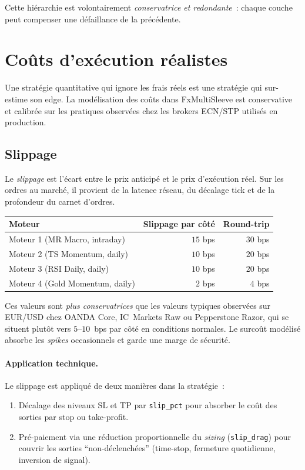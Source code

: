 \documentclass[11pt, a4paper]{scrartcl}
\begin{document}
Cette hiérarchie est volontairement \emph{conservatrice et redondante}~: chaque couche peut compenser une défaillance de la précédente.


\section{Coûts d'exécution réalistes}
\label{sec:costs}

Une stratégie quantitative qui ignore les frais réels est une stratégie qui sur-estime son edge. La modélisation des coûts dans FxMultiSleeve est conservative et calibrée sur les pratiques observées chez les brokers ECN/STP utilisés en production.

\subsection{Slippage}

Le \emph{slippage} est l'écart entre le prix anticipé et le prix d'exécution réel. Sur les ordres au marché, il provient de la latence réseau, du décalage tick et de la profondeur du carnet d'ordres.

\begin{center}
\renewcommand{\arraystretch}{1.2}
\begin{tabular}{lrr}
\toprule
\textbf{Moteur} & \textbf{Slippage par côté} & \textbf{Round-trip} \\
\midrule
Moteur 1 (MR Macro, intraday) & $15$ bps & $30$ bps \\
Moteur 2 (TS Momentum, daily) & $10$ bps & $20$ bps \\
Moteur 3 (RSI Daily, daily)   & $10$ bps & $20$ bps \\
Moteur 4 (Gold Momentum, daily) & $2$ bps & $4$ bps \\
\bottomrule
\end{tabular}
\end{center}

Ces valeurs sont \emph{plus conservatrices} que les valeurs typiques observées sur EUR/USD chez OANDA Core, IC~Markets Raw ou Pepperstone Razor, qui se situent plutôt vers $5$--$10$~bps par côté en conditions normales. Le surcoût modélisé absorbe les \emph{spikes} occasionnels et garde une marge de sécurité.

\paragraph{Application technique.}
Le slippage est appliqué de deux manières dans la stratégie~:
\begin{enumerate}
\item Décalage des niveaux SL et TP par \texttt{slip\_pct} pour absorber le coût des sorties par stop ou take-profit.
\item Pré-paiement via une réduction proportionnelle du \emph{sizing} (\texttt{slip\_drag}) pour couvrir les sorties \enquote{non-déclenchées} (time-stop, fermeture quotidienne, inversion de signal).
\end{enumerate}
\end{document}
